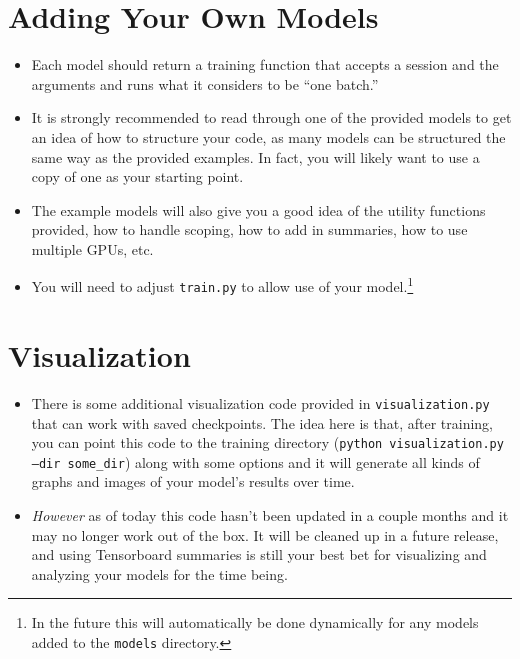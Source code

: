 \documentclass{article}
\begin{document}
\begin{flushleft}
\section{Adding Your Own Models}
\begin{itemize}
\item Each model should return a training function that accepts a session and the arguments and runs what it considers to be ``one batch.''
\item It is strongly recommended to read through one of the provided models to get an idea of how to structure your code, as many models can be structured the same way as the provided examples. In fact, you will likely want to use a copy of one as your starting point. 
\item The example models will also give you a good idea of the utility functions provided, how to handle scoping, how to add in summaries, how to use multiple GPUs, etc. 
\item You will need to adjust \texttt{train.py} to allow use of your model.\footnote{In the future this will automatically be done dynamically for any models added to the \texttt{models} directory.}
\end{itemize}

\section{Visualization}
\begin{itemize}
\item There is some additional visualization code provided in \texttt{visualization.py} that can work with saved checkpoints. The idea here is that, after training, you can point this code to the training directory (\texttt{python visualization.py --dir some\_dir}) along with some options and it will generate all kinds of graphs and images of your model's results over time. 
\item \emph{However} as of today this code hasn't been updated in a couple months and it may no longer work out of the box. It will be cleaned up in a future release, and using Tensorboard summaries is still your best bet for visualizing and analyzing your models for the time being. 
\end{itemize}


\end{flushleft}
\end{document}
